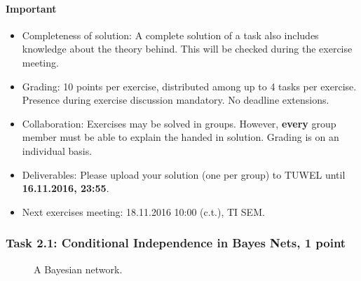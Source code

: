 \documentclass[12pt,a4paper,oneside]{article}
\begin{document}
\paragraph{Important}
\begin{itemize}
  \item Completeness of solution: A complete solution of a task also
    includes knowledge about the theory behind. This will be checked
    during the exercise meeting.
  \item Grading: 10 points per exercise, distributed among up to 4
    tasks per exercise. Presence during exercise discussion
    mandatory. No deadline extensions.
  \item Collaboration: Exercises may be solved in groups. However, {\bf every}
    group member must be able to explain the handed in solution. Grading is on
    an individual basis.
  \item Deliverables: Please upload your solution (one per group) to
    TUWEL until {\bf 16.11.2016, 23:55}.
  \item Next exercises meeting: 18.11.2016 10:00 (c.t.), TI SEM.
\end{itemize}


%
%
\subsubsection*{Task 2.1: Conditional Independence in Bayes Nets, 1 point}
\begin{figure}[ht]
  \centering
  \caption{A Bayesian network.}
  \label{fig:bn1}
\end{figure}
\end{document}
